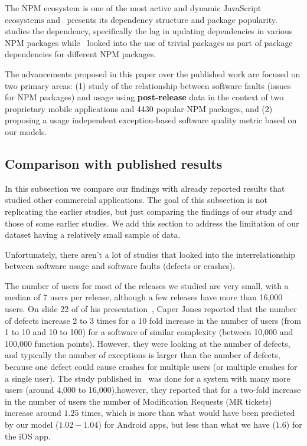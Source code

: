 \documentclass[smallcondensed]{svjour3}     %
\begin{document}
The NPM ecosystem is one of the most active and dynamic JavaScript ecosystems and~\cite{wittern2016look} presents its dependency structure and package popularity.~\cite{zerouali2018empirical} studies the dependency, specifically the lag in updating dependencies in various NPM packages while~\cite{abdalkareem2017developers} looked into the use of trivial packages as part of package dependencies for different NPM packages. 


The advancements proposed in this paper over the published work are focused 
on two primary areas: (1) study of the relationship between software faults (issues for NPM packages) and usage using \textbf{post-release} data in the context of two proprietary mobile applications and 4430 popular NPM packages, and (2) proposing a usage independent exception-based software quality metric based on our models.


\subsection{Comparison with published results}
In this subsection we compare our findings with already reported results that studied other commercial applications. The goal of this subsection is not replicating the earlier studies, but just 
comparing the findings of our study and those of some earlier studies. We add this section to address 
the limitation of our dataset having a relatively small sample of data. 

Unfortunately, there aren't a lot of studies that looked into the interrelationship between software usage and software faults (defects or crashes).

The number of users for most of the releases we studied are very small, with a 
median of 7 users per release, although a few releases have more than 16,000 users.
On slide 22 of of his presentation~\cite{caper}, Caper Jones reported that the
number of defects increase 2 to 3 times for a 10 fold increase in the number of users
(from 1 to 10 and 10 to 100) for a software of similar complexity (between 10,000
and 100,000 function points). However, they were looking at the number of 
defects, and typically the number of 
exceptions is larger than the number of defects, because one defect could cause crashes for multiple users (or multiple crashes for a single user). The study published in~\cite{IQ08} was done for a system with many 
more users (around 4,000 to 16,000),however, they reported that for a two-fold increase in the 
number of users the number of Modification Requests (MR tickets) increase around $1.25$ times, 
which is more than what would have been predicted by our model ($1.02 - 1.04$) for Android apps, but less than what we have ($1.6$) for the iOS app. 
\end{document}
